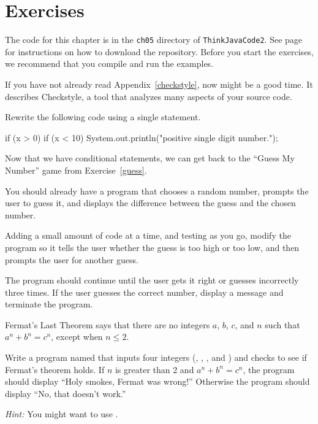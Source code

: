 \section{Exercises}

The code for this chapter is in the {\tt ch05} directory of {\tt ThinkJavaCode2}.
See page~\pageref{code} for instructions on how to download the repository.
Before you start the exercises, we recommend that you compile and run the examples.

If you have not already read Appendix~\ref{checkstyle}, now might be a good time.
It describes Checkstyle, a tool that analyzes many aspects of your source code.


\begin{exercise}  %

Rewrite the following code using a single  statement.

\begin{code}
if (x > 0) {
    if (x < 10) {
        System.out.println("positive single digit number.");
    }
}
\end{code}

\end{exercise}


\begin{exercise}  %

Now that we have conditional statements, we can get back to the ``Guess My Number'' game from Exercise~\ref{guess}.

You should already have a program that chooses a random number, prompts the user to guess it, and displays the difference between the guess and the chosen number.

Adding a small amount of code at a time, and testing as you go, modify the program so it tells the user whether the guess is too high or too low, and then prompts the user for another guess.

The program should continue until the user gets it right or guesses incorrectly three times.
If the user guesses the correct number, display a message and terminate the program.

\end{exercise}


\begin{exercise}  %

Fermat's Last Theorem says that there are no integers $a$, $b$, $c$, and $n$ such that $a^n + b^n = c^n$, except when $n \leq 2$.

Write a program named  that inputs four integers (, , , and ) and checks to see if Fermat's theorem holds.
If $n$ is greater than 2 and $a^n + b^n = c^n$, the program should display ``Holy smokes, Fermat was wrong!''
Otherwise the program should display ``No, that doesn't work.''

{\it Hint:} You might want to use .

\end{exercise}


